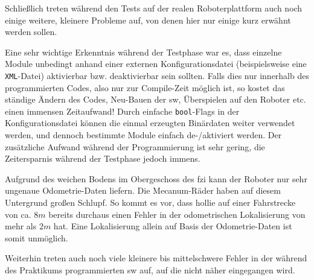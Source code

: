 Schließlich treten während den Tests auf der realen Roboterplattform auch noch einige weitere, kleinere Probleme auf, von denen hier nur einige kurz erwähnt werden sollen.

Eine sehr wichtige Erkenntnis während der Testphase war es, dass einzelne Module unbedingt anhand einer externen Konfigurationsdatei (beispielsweise eine \lstinline{XML}-Datei) aktivierbar bzw. deaktivierbar sein sollten.
Falls dies nur innerhalb des programmierten Codes, also nur zur Compile-Zeit möglich ist, so kostet das ständige Ändern des Codes, Neu-Bauen der \gls{sw}, Überspielen auf den Roboter etc. einen immensen Zeitaufwand!
Durch einfache \lstinline{bool}-Flags in der Konfigurationsdatei können die einmal erzeugten Binärdaten weiter verwendet werden, und dennoch bestimmte Module einfach de-/aktiviert werden.
Der zusätzliche Aufwand während der Programmierung ist sehr gering, die Zeitersparnis während der Testphase jedoch immens.

Aufgrund des weichen Bodens im Obergeschoss des \gls{fzi} kann der Roboter nur sehr ungenaue Odometrie-Daten liefern.
Die Mecanum-Räder haben auf diesem Untergrund großen Schlupf.
So kommt es vor, dass \gls{hollie} auf einer Fahrstrecke von ca. $8m$ bereits durchaus einen Fehler in der odometrischen Lokalisierung von mehr als $2m$ hat.
Eine Lokalisierung allein auf Basis der Odometrie-Daten ist somit unmöglich.

Weiterhin treten auch noch viele kleinere bis mittelschwere Fehler in der während des Praktikums programmierten \gls{sw} auf, auf die nicht näher eingegangen wird.

